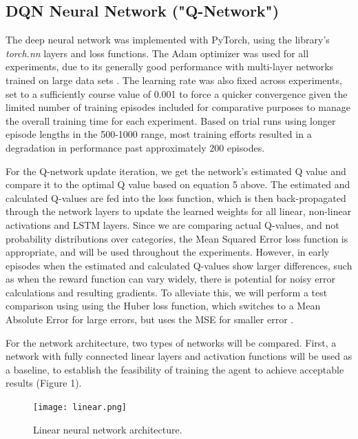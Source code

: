 \documentclass[10pt,twocolumn,letterpaper]{article}
\begin{document}
\subsection{DQN Neural Network ("Q-Network")}
The deep neural network was implemented with PyTorch, using the library's \emph{torch.nn} layers and loss functions. The Adam optimizer was used for all experiments, due to its generally good performance with multi-layer networks trained on large data sets \cite{adam}.
The learning rate was also fixed across experiments, set to a sufficiently course value of 0.001 to force a quicker convergence given the limited number of training episodes included for comparative purposes to manage the overall training time for each experiment. Based on trial runs using longer episode lengths in the 500-1000 range, most training efforts resulted in a degradation in performance past approximately 200 episodes.

For the Q-network update iteration, we get the network's estimated Q value and compare it to the optimal Q value based on equation 5 above. The estimated and calculated Q-values are fed into the loss function, which is then back-propagated through the network layers to update the learned weights for all linear, non-linear activations and LSTM layers. Since we are comparing actual Q-values, and not probability distributions over categories, the Mean Squared Error loss function is appropriate, and will be used throughout the experiments. However, in early episodes when the estimated and calculated Q-values show larger differences, such as when the reward function can vary widely, there is potential for noisy error calculations and resulting gradients. To alleviate this, we will perform a test comparison using using the Huber loss function, which switches to a Mean Absolute Error for large errors, but uses the MSE for smaller error \cite{huberloss}.

For the network architecture, two types of networks will be compared. First, a network with fully connected linear layers and activation functions will be used as a baseline, to establish the feasibility of training the agent to achieve acceptable results (Figure 1). 

\begin{figure}[hbt!]
    \begin{center}
    \texttt{[image: linear.png]}
    \caption{Linear neural network architecture.}
    \end{center}
\end{figure}
\end{document}
